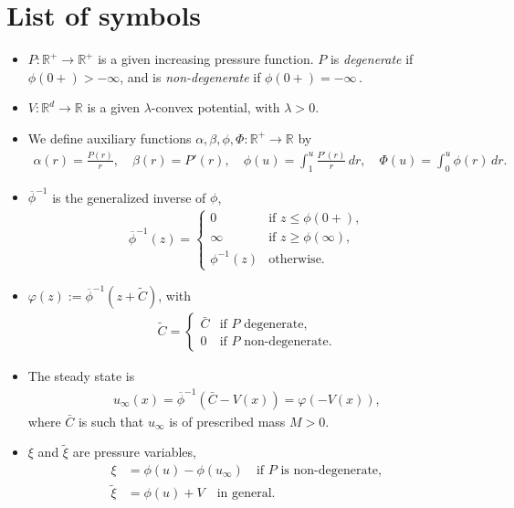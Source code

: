 \documentclass[reqno]{amsart}
\newcommand{\setR}{\mathbb{R}}
\newcommand{\R}{\mathbb{R}}
\newcommand{\Rd}{{\R^d}}
\begin{document}
\section{List of symbols}\label{sec-appendix-symbols}
%
\begin{itemize}
\item $P:\setR^+\to\setR^+$ is a given increasing pressure function. $P$ is \emph{degenerate} if $\phi(0+)>-\infty$,
  and is \emph{non-degenerate} if $\phi(0+)=-\infty$\,.
\item $V:\Rd\to\R$ is a given $\lambda$-convex potential, with $\lambda>0$.
\item We define auxiliary functions $\alpha,\beta,\phi,\Phi:\setR^+\to\setR$ by
  \begin{align*}
    \alpha(r) = \frac{P(r)}r, \quad \beta(r)=P'(r), \quad
    \phi(u) = \int_1^u\frac{P'(r)}r\,dr,
    \quad
    \Phi(u) = \int_0^u\phi(r)\,dr.
  \end{align*}
\item $\overline{\phi}^{-1}$ is the generalized inverse of $\phi$,
  \begin{align*}
    \overline{\phi}^{-1}(z) =
    \begin{cases}
      0 & \text{if $z\le\phi(0+)$}, \\
      \infty & \text{if $z\ge\phi(\infty)$}, \\
      \phi^{-1}(z) & \text{otherwise}.
    \end{cases}
  \end{align*}
\item $\varphi(z) := \overline{\phi}^{-1}(z+\tilde C)$, with
  \begin{align*}
    \tilde C =
    \begin{cases}
      \bar C & \text{if $P$ degenerate}, \\
      0 & \text{if $P$ non-degenerate}.
    \end{cases}
  \end{align*}
\item The steady state is
  \begin{align*}
    u_\infty(x) = \overline{\phi}^{-1}(\bar C-V(x))=\varphi(-V(x)),
  \end{align*}
  where $\bar C$ is such that $u_\infty$ is of prescribed mass $M>0$. 
\item $\xi$ and $\tilde\xi$ are pressure variables,
  \begin{align*}
    \xi & = \phi(u)-\phi(u_\infty) \quad \text{if $P$ is non-degenerate}, \\
    \tilde\xi &= \phi(u)+V \quad \text{in general}.

\end{align*}
\end{itemize}
\end{document}
